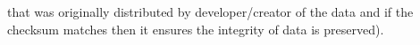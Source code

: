 that was originally distributed by developer/creator of the data and if the
checksum matches then it ensures the integrity of data is preserved). 

